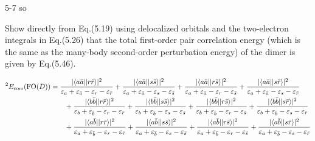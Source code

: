 \documentclass[a4paper]{book}
\newcommand{\corr}{{\rm corr}}
\begin{document}
	\begin{solution}
		5-7 so
	\end{solution}
	
	\begin{exercise}
	Show directly from Eq.(5.19) using delocalized orbitals and the two-electron integrals in Eq.(5.26) that the total first-order pair correlation energy (which is the same as the many-body second-order perturbation energy) of the dimer is given by Eq.(5.46).
	\end{exercise}
	
	\begin{solution}
	
	\begin{align*}
	^2 E_\corr( {\rm FO}(D) ) &= \frac{ | \langle a \bar{a} || r \bar{r} \rangle |^2 }{ \varepsilon_a + \varepsilon_{\bar{a}} - \varepsilon_r - \varepsilon_{\bar{r}} }	+ \frac{ | \langle a \bar{a} || s \bar{s} \rangle |^2 }{ \varepsilon_a + \varepsilon_{\bar{a}} - \varepsilon_s - \varepsilon_{\bar{s}} } + \frac{ | \langle a \bar{a} || r \bar{s} \rangle |^2 }{ \varepsilon_a + \varepsilon_{\bar{a}} - \varepsilon_r - \varepsilon_{\bar{s}} } + \frac{ | \langle a \bar{a} || s \bar{r} \rangle |^2 }{ \varepsilon_a + \varepsilon_{\bar{a}} - \varepsilon_s - \varepsilon_{\bar{r}} } \\
	&\hspace{2em} + \frac{ | \langle b \bar{b} || r \bar{r} \rangle |^2 }{ \varepsilon_b + \varepsilon_{\bar{b}} - \varepsilon_r - \varepsilon_{\bar{r}} }	+ \frac{ | \langle b \bar{b} || s \bar{s} \rangle |^2 }{ \varepsilon_b + \varepsilon_{\bar{b}} - \varepsilon_s - \varepsilon_{\bar{s}} } + \frac{ | \langle b \bar{b} || r \bar{s} \rangle |^2 }{ \varepsilon_b + \varepsilon_{\bar{b}} - \varepsilon_r - \varepsilon_{\bar{s}} } + \frac{ | \langle b \bar{b} || s \bar{r} \rangle |^2 }{ \varepsilon_b + \varepsilon_{\bar{b}} - \varepsilon_s - \varepsilon_{\bar{r}} } \\
	&\hspace{2em} + \frac{ | \langle a \bar{b} || r \bar{r} \rangle |^2 }{ \varepsilon_a + \varepsilon_{\bar{b}} - \varepsilon_r - \varepsilon_{\bar{r}} }	+ \frac{ | \langle a \bar{b} || s \bar{s} \rangle |^2 }{ \varepsilon_a + \varepsilon_{\bar{b}} - \varepsilon_s - \varepsilon_{\bar{s}} } + \frac{ | \langle a \bar{b} || r \bar{s} \rangle |^2 }{ \varepsilon_a + \varepsilon_{\bar{b}} - \varepsilon_r - \varepsilon_{\bar{s}} } + \frac{ | \langle a \bar{b} || s \bar{r} \rangle |^2 }{ \varepsilon_a + \varepsilon_{\bar{b}} - \varepsilon_s - \varepsilon_{\bar{r}} } \\

\end{align*}
\end{solution}
\end{document}
